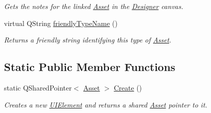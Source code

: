 \begin{DoxyCompactItemize}
\begin{DoxyCompactList}\small\item\em Gets the notes for the linked \hyperlink{class_picto_1_1_asset}{Asset} in the \hyperlink{class_designer}{Designer} canvas. \end{DoxyCompactList}\item 
virtual Q\-String \hyperlink{class_picto_1_1_u_i_element_a907203861ddc4daa9676fdf5db9e56ca}{friendly\-Type\-Name} ()
\begin{DoxyCompactList}\small\item\em Returns a friendly string identifying this type of \hyperlink{class_picto_1_1_asset}{Asset}. \end{DoxyCompactList}\end{DoxyCompactItemize}
\subsection*{Static Public Member Functions}
\begin{DoxyCompactItemize}
\item 
\hypertarget{class_picto_1_1_u_i_element_aed5acb36c391f9b2893e84efffc9eb70}{static Q\-Shared\-Pointer$<$ \hyperlink{class_picto_1_1_asset}{Asset} $>$ \hyperlink{class_picto_1_1_u_i_element_aed5acb36c391f9b2893e84efffc9eb70}{Create} ()}\label{class_picto_1_1_u_i_element_aed5acb36c391f9b2893e84efffc9eb70}

\begin{DoxyCompactList}\small\item\em Creates a new \hyperlink{class_picto_1_1_u_i_element}{U\-I\-Element} and returns a shared \hyperlink{class_picto_1_1_asset}{Asset} pointer to it. \end{DoxyCompactList}\end{DoxyCompactItemize}
